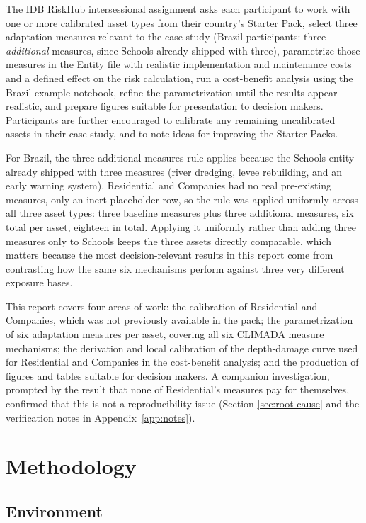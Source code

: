 \documentclass[11pt]{article}
\begin{document}
The IDB RiskHub intersessional assignment asks each participant to work with one or more
calibrated asset types from their country's Starter Pack, select three adaptation measures
relevant to the case study (Brazil participants: three \emph{additional} measures, since
Schools already shipped with three), parametrize those measures in the Entity file with
realistic implementation and maintenance costs and a defined effect on the risk
calculation, run a cost-benefit analysis using the Brazil example notebook, refine the
parametrization until the results appear realistic, and prepare figures suitable for
presentation to decision makers. Participants are further encouraged to calibrate any
remaining uncalibrated assets in their case study, and to note ideas for improving the
Starter Packs.

For Brazil, the three-additional-measures rule applies because the Schools entity already
shipped with three measures (river dredging, levee rebuilding, and an early warning
system). Residential and Companies had no real pre-existing measures, only an inert
placeholder row, so the rule was applied uniformly across all three asset types: three
baseline measures plus three additional measures, six total per asset, eighteen in total.
Applying it uniformly rather than adding three measures only to Schools keeps the three
assets directly comparable, which matters because the most decision-relevant results in this
report come from contrasting how the same six mechanisms perform against three very
different exposure bases.

This report covers four areas of work: the calibration of Residential and Companies, which
was not previously available in the pack; the parametrization of six adaptation measures
per asset, covering all six CLIMADA measure mechanisms; the derivation and local
calibration of the depth-damage curve used for Residential and Companies in the
cost-benefit analysis; and the production of figures and tables suitable for decision
makers. A companion investigation, prompted by the result that none of Residential's
measures pay for themselves, confirmed that this is not a reproducibility issue (Section
\ref{sec:root-cause} and the verification notes in Appendix~\ref{app:notes}).

\section{Methodology}

\subsection{Environment}
\end{document}
